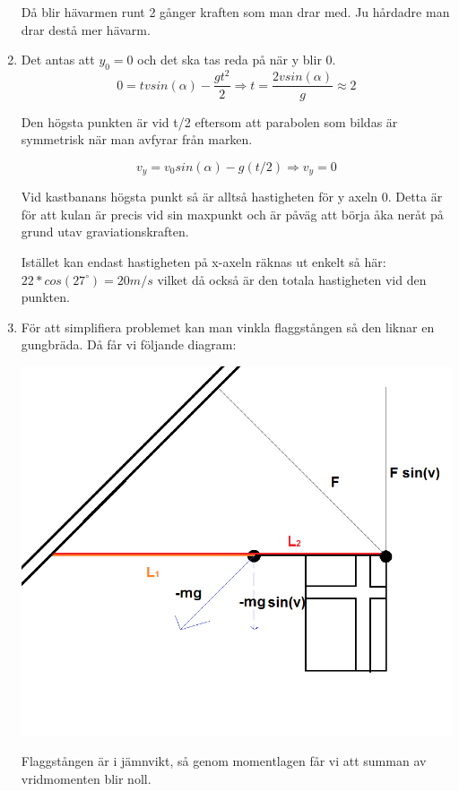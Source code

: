 \documentclass[a4paper,12pt]{article}
\begin{document}
\begin{enumerate}
            Då blir hävarmen runt 2 gånger kraften som man drar med. Ju hårdadre man drar destå
            mer hävarm.

      \item Det antas att $y_0=0$ och det ska tas reda på när y blir 0.
            $$0=tvsin(\alpha)-\frac{gt^2}{2} \Rightarrow t=\frac{2vsin(\alpha)}{g}\approx 2$$

            Den högsta punkten är vid t/2 eftersom att parabolen som bildas är symmetrisk när
            man avfyrar från marken.

            $$v_y=v_0sin(\alpha)-g(t/2) \Rightarrow v_y=0$$

            Vid kastbanans högsta punkt så är alltså hastigheten för y axeln 0. Detta är för att
            kulan är precis vid sin maxpunkt och är påväg att börja åka neråt på grund utav
            graviationskraften.

            Istället kan endast hastigheten på x-axeln räknas ut enkelt så här:
            $22*cos(27^\circ)=20 m/s$ vilket då också är den totala hastigheten vid den punkten.

      \item
            För att simplifiera problemet kan man vinkla flaggstången så den liknar
            en gungbräda. Då får vi följande diagram:

            \includegraphics[scale=0.55]{Figur2.png}

            Flaggstången är i jämnvikt, så genom momentlagen får vi att summan av vridmomenten
            blir noll.


\end{enumerate}
\end{document}
